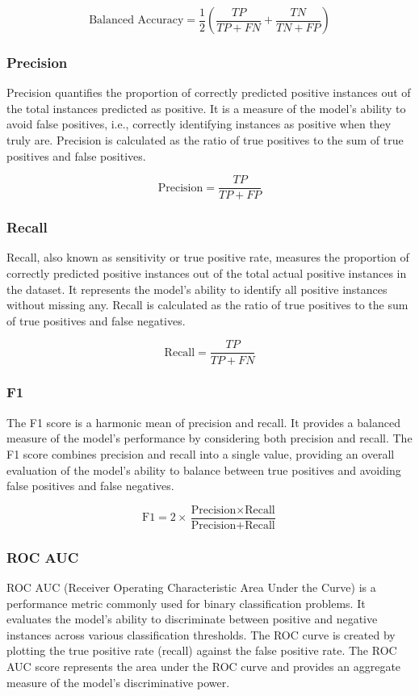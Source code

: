\documentclass[12pt, a4paper,twoside]{report}
\numberwithin{equation}{chapter}
\begin{document}
\[
\text{Balanced Accuracy} = \frac{1}{2} \left( \frac{TP}{TP + FN} + \frac{TN}{TN + FP} \right)
\]

\subsubsection{Precision}
Precision quantifies the proportion of correctly predicted positive instances out of the total instances predicted as positive. It is a measure of the model's ability to avoid false positives, i.e., correctly identifying instances as positive when they truly are. Precision is calculated as the ratio of true positives to the sum of true positives and false positives.

\[
\text{Precision} = \frac{TP}{TP + FP}
\]

\subsubsection{Recall} 
Recall, also known as sensitivity or true positive rate, measures the proportion of correctly predicted positive instances out of the total actual positive instances in the dataset. It represents the model's ability to identify all positive instances without missing any. Recall is calculated as the ratio of true positives to the sum of true positives and false negatives.

\[
\text{Recall} = \frac{TP}{TP + FN}
\]

\subsubsection{F1} 
The F1 score is a harmonic mean of precision and recall. It provides a balanced measure of the model's performance by considering both precision and recall. The F1 score combines precision and recall into a single value, providing an overall evaluation of the model's ability to balance between true positives and avoiding false positives and false negatives.

\[
\text{F1} = 2 \times \frac{\text{Precision} \times \text{Recall}}{\text{Precision} + \text{Recall}}
\]

\subsubsection{ROC AUC}
ROC AUC (Receiver Operating Characteristic Area Under the Curve) is a performance metric commonly used for binary classification problems. It evaluates the model's ability to discriminate between positive and negative instances across various classification thresholds. The ROC curve is created by plotting the true positive rate (recall) against the false positive rate. The ROC AUC score represents the area under the ROC curve and provides an aggregate measure of the model's discriminative power.
\end{document}
